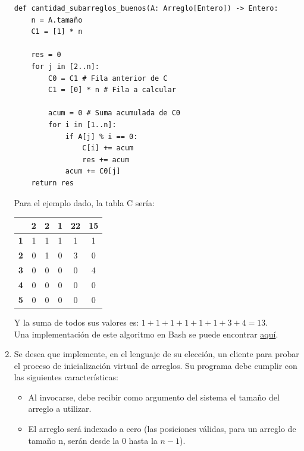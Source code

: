 \documentclass[letterpaper, 12pt]{article}
\begin{document}
\begin{enumerate}
\begin{verbatim}
def cantidad_subarreglos_buenos(A: Arreglo[Entero]) -> Entero:
    n = A.tamaño
    C1 = [1] * n

    res = 0
    for j in [2..n]:
        C0 = C1 # Fila anterior de C
        C1 = [0] * n # Fila a calcular

        acum = 0 # Suma acumulada de C0
        for i in [1..n]:
            if A[j] % i == 0:
                C[i] += acum
                res += acum
            acum += C0[j]
    return res
\end{verbatim}

Para el ejemplo dado, la tabla C sería:

\begin{center}
    \begin{tabular}{|c|c|c|c|c|c|}
        \hline
        & \textbf{2} & \textbf{2} & \textbf{1} & \textbf{22} & \textbf{15} \\ \hline
        \textbf{1} & 1 & 1 & 1 & 1 & 1 \\ \hline
        \textbf{2} & 0 & 1 & 0 & 3 & 0 \\ \hline
        \textbf{3} & 0 & 0 & 0 & 0 & 4 \\ \hline
        \textbf{4} & 0 & 0 & 0 & 0 & 0 \\ \hline
        \textbf{5} & 0 & 0 & 0 & 0 & 0 \\ \hline
    \end{tabular}
\end{center}

Y la suma de todos sus valores es: $1 + 1 + 1 + 1 + 1 + 1 + 3 + 4 = 13$. \\

Una implementación de este algoritmo en Bash se puede encontrar \href{https://www.google.com}{aquí}.

\pagebreak

\item Se desea que implemente, en el lenguaje de su elección, un cliente para probar el proceso de inicialización virtual de arreglos. Su programa debe cumplir con las siguientes características:

\begin{itemize}
    \item  Al invocarse, debe recibir como argumento del sistema el tamaño del arreglo a utilizar.
    \item El arreglo será indexado a cero (las posiciones válidas, para un arreglo de tamaño n, serán desde la $0$ hasta la $n - 1$).


\end{itemize}
\end{enumerate}
\end{document}
